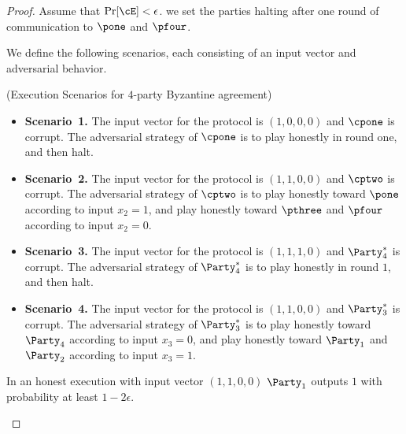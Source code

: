 \begin{proof}
	Assume that $\Pr[\cE] < \epsilon$. \Wlg we set the parties halting after one round of communication to $\pone$ and $\pfour$.
	
	We define the following scenarios, each consisting of an input vector and adversarial behavior.
	
	\begin{definition}{(Execution Scenarios for $4$-party Byzantine agreement)}

	
	\begin{itemize}
	\item\textbf{Scenario~1.}
	The input vector for the protocol is $(1,0,0,0)$ and $\cpone$ is corrupt. The adversarial strategy of  $\cpone$ is to play honestly in round one, and then halt.
	
	\item\textbf{Scenario~2.}
	The input vector for the protocol is $(1,1,0,0)$ and $\cptwo$ is corrupt. The adversarial strategy of $\cptwo$ is to play honestly toward $\pone$ according to input $x_2=1$, and play honestly toward $\pthree$ and $\pfour$ according to input $x_2=0$.
	
	\item\textbf{Scenario~3.}
	The input vector for the protocol is $(1,1,1,0)$ and $\Party_4^\ast$ is corrupt. The adversarial strategy of  $\Party_4^\ast$ is to play honestly in round $1$, and then halt.
	
	\item\textbf{Scenario~4.}
	The input vector for the protocol is $(1,1,0,0)$ and $\Party_3^\ast$ is corrupt. The adversarial strategy of $\Party_3^\ast$ is to play honestly toward $\Party_4$ according to input $x_3=0$, and play honestly toward $\Party_1$ and $\Party_2$ according to input $x_3=1$.
	
	\end{itemize}

	\end{definition}


\begin{claim}\label{claim:4.1}
	In an honest execution with input vector $(1,1,0,0)$ $\Party_1$ outputs $1$ with probability at least $1-2\epsilon$.
\end{claim}


\end{proof}
